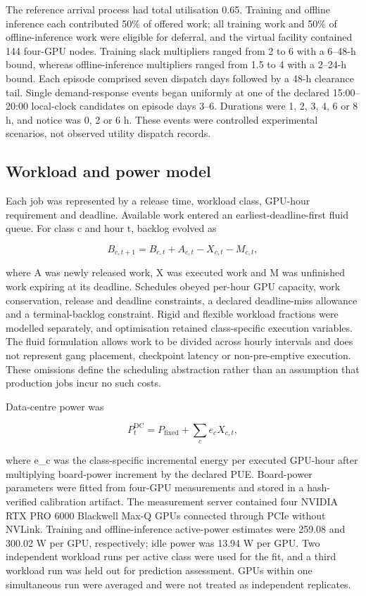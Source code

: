 \documentclass[10pt,a4paper]{article}
\begin{document}
The reference arrival process had total utilisation 0.65. Training and offline inference each contributed 50\% of offered work; all training work and 50\% of offline-inference work were eligible for deferral, and the virtual facility contained 144 four-GPU nodes. Training slack multipliers ranged from 2 to 6 with a 6–48-h bound, whereas offline-inference multipliers ranged from 1.5 to 4 with a 2–24-h bound. Each episode comprised seven dispatch days followed by a 48-h clearance tail. Single demand-response events began uniformly at one of the declared 15:00–20:00 local-clock candidates on episode days 3–6. Durations were 1, 2, 3, 4, 6 or 8 h, and notice was 0, 2 or 6 h. These events were controlled experimental scenarios, not observed utility dispatch records.


\subsection*{Workload and power model}

Each job was represented by a release time, workload class, GPU-hour requirement and deadline. Available work entered an earliest-deadline-first fluid queue. For class c and hour t, backlog evolved as


\begin{equation*}
B_{c,t+1}=B_{c,t}+A_{c,t}-X_{c,t}-M_{c,t},
\end{equation*}

where A was newly released work, X was executed work and M was unfinished work expiring at its deadline. Schedules obeyed per-hour GPU capacity, work conservation, release and deadline constraints, a declared deadline-miss allowance and a terminal-backlog constraint. Rigid and flexible workload fractions were modelled separately, and optimisation retained class-specific execution variables. The fluid formulation allows work to be divided across hourly intervals and does not represent gang placement, checkpoint latency or non-pre-emptive execution. These omissions define the scheduling abstraction rather than an assumption that production jobs incur no such costs.


Data-centre power was


\begin{equation*}
P^{\mathrm{DC}}_t=P_{\mathrm{fixed}}+\sum_c e_cX_{c,t},
\end{equation*}

where e\_c was the class-specific incremental energy per executed GPU-hour after multiplying board-power increment by the declared PUE. Board-power parameters were fitted from four-GPU measurements and stored in a hash-verified calibration artifact. The measurement server contained four NVIDIA RTX PRO 6000 Blackwell Max-Q GPUs connected through PCIe without NVLink. Training and offline-inference active-power estimates were 259.08 and 300.02 W per GPU, respectively; idle power was 13.94 W per GPU. Two independent workload runs per active class were used for the fit, and a third workload run was held out for prediction assessment. GPUs within one simultaneous run were averaged and were not treated as independent replicates.
\end{document}
